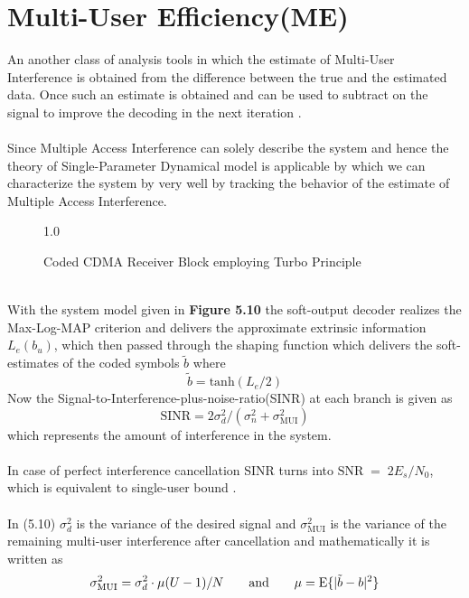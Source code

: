 \section{Multi-User Efficiency(ME)}
An another class of analysis tools in which the estimate of Multi-User Interference is obtained from the difference between the true and the estimated data. Once such an estimate is obtained and can be used to subtract on the signal to improve the decoding in the next iteration \cite{GC}.\\ \\
Since Multiple Access Interference can solely describe the system and hence the theory of Single-Parameter Dynamical model is applicable by which we can characterize the system by very well by tracking the behavior of the estimate of Multiple Access Interference.
\begin{figure}[htb]
\centerline{  {1.0} }
\caption{Coded CDMA Receiver Block employing Turbo Principle}
\end{figure}\\
With the system model given in \textbf{Figure 5.10} the soft-output decoder realizes the Max-Log-MAP criterion and delivers the approximate extrinsic information $L_e(b_u)$, which then passed through the shaping function which delivers the soft-estimates of the coded symbols $\tilde{b}$ where
\begin{equation}
\tilde{b}=\mathrm{tanh}(L_e/2)
\end{equation}
Now the Signal-to-Interference-plus-noise-ratio(SINR) at each branch is given as
\begin{equation}
\mathrm{SINR}=2\sigma_d^2/(\sigma_n^2+\sigma_{\mathrm{MUI}}^2)
\end{equation}
which represents the amount of interference in the system.\\ \\
In case of perfect interference cancellation SINR turns into $\mathrm{SNR}\;=\;2E_s/N_0$, which is equivalent to single-user bound \cite{PETRA}.\\ \\
In (5.10) $\sigma_d^2$ is the variance of the desired signal and $\sigma_{\mathrm{MUI}}^2$ is the variance of the remaining multi-user interference after cancellation and mathematically it is written as
\begin{equation}
\sigma_{\mathrm{MUI}}^2=\sigma_d^2\cdot \mu(U-1)/N\hspace{7mm}\mathrm{and}\hspace{7mm}\mu=\mathrm{E}\{\vert\tilde{b}-b\vert^2\}
\end{equation}

